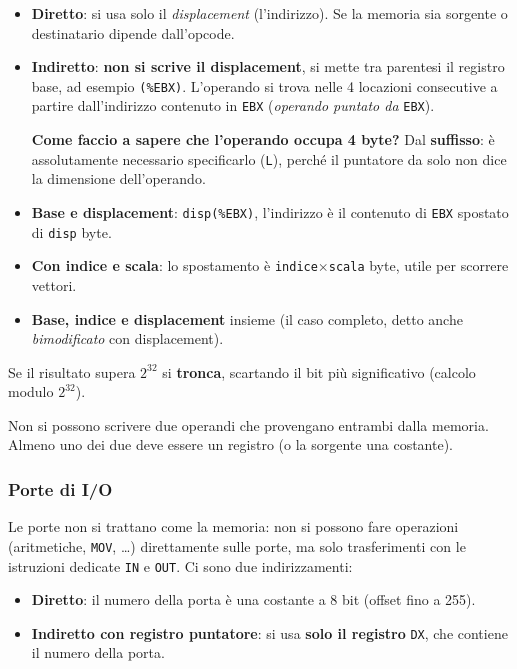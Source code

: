 \documentclass[11pt,a4paper]{article}
\begin{document}
\begin{itemize}[leftmargin=*]
  \item \textbf{Diretto}: si usa solo il \emph{displacement} (l'indirizzo). Se la memoria sia sorgente o destinatario dipende dall'opcode.
  \item \textbf{Indiretto}: \textbf{non si scrive il displacement}, si mette tra parentesi il registro base, ad esempio \texttt{(\%EBX)}. L'operando si trova nelle 4 locazioni consecutive a partire dall'indirizzo contenuto in \texttt{EBX} (\emph{operando puntato da} \texttt{EBX}).

  \textbf{Come faccio a sapere che l'operando occupa 4 byte?} Dal \textbf{suffisso}: è assolutamente necessario specificarlo (\texttt{L}), perché il puntatore da solo non dice la dimensione dell'operando.
  \item \textbf{Base e displacement}: \texttt{disp(\%EBX)}, l'indirizzo è il contenuto di \texttt{EBX} spostato di \texttt{disp} byte.
  \item \textbf{Con indice e scala}: lo spostamento è \texttt{indice}$\times$\texttt{scala} byte, utile per scorrere vettori.
  \item \textbf{Base, indice e displacement} insieme (il caso completo, detto anche \emph{bimodificato} con displacement).
\end{itemize}

Se il risultato supera $2^{32}$ si \textbf{tronca}, scartando il bit più significativo (calcolo modulo $2^{32}$).

\begin{nota}
Non si possono scrivere due operandi che provengano entrambi dalla memoria. Almeno uno dei due deve essere un registro (o la sorgente una costante).
\end{nota}

\subsubsection*{Porte di I/O}

Le porte non si trattano come la memoria: non si possono fare operazioni (aritmetiche, \texttt{MOV}, \ldots) direttamente sulle porte, ma solo trasferimenti con le istruzioni dedicate \texttt{IN} e \texttt{OUT}. Ci sono due indirizzamenti:

\begin{itemize}[leftmargin=*]
  \item \textbf{Diretto}: il numero della porta è una costante a 8 bit (offset fino a 255).
  \item \textbf{Indiretto con registro puntatore}: si usa \textbf{solo il registro} \texttt{DX}, che contiene il numero della porta.
\end{itemize}
\end{document}
